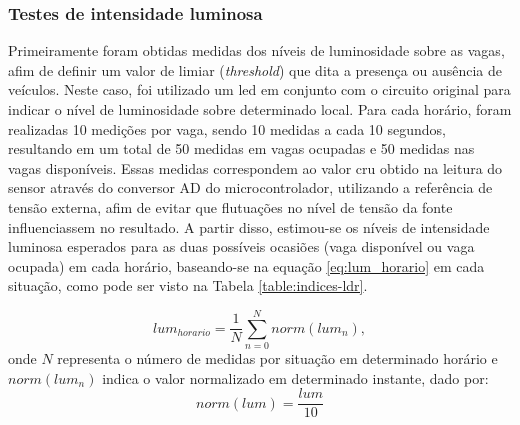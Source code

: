 \documentclass[oneside,openright,12pt]{ufsm_2015} %
\begin{document}
    \subsubsection{Testes de intensidade luminosa}
    Primeiramente foram obtidas medidas dos níveis de luminosidade sobre as vagas, afim de definir um valor de limiar (\textit{threshold}) que dita a presença ou ausência de veículos. Neste caso, foi utilizado um led em conjunto com o circuito original para indicar o nível de luminosidade sobre determinado local. Para cada horário, foram realizadas 10 medições por vaga, sendo 10 medidas a cada 10 segundos, resultando em um total de 50 medidas em vagas ocupadas e 50 medidas nas vagas disponíveis. Essas medidas correspondem ao valor cru obtido na leitura do sensor através do conversor AD do microcontrolador, utilizando a referência de tensão externa, afim de evitar que flutuações no nível de tensão da fonte influenciassem no resultado. A partir disso, estimou-se os níveis de intensidade luminosa esperados para as duas possíveis ocasiões (vaga disponível ou vaga ocupada) em cada horário, baseando-se na equação \ref{eq:lum_horario} em cada situação, como pode ser visto na Tabela \ref{table:indices-ldr}. 

    \begin{equation}
        lum_{horario} = \frac{1}{N} \sum_{n=0}^{N} norm(lum_n),
        \label{eq:lum_horario}
    \end{equation}
    onde $N$ representa o número de medidas por situação em determinado horário e $norm(lum_n)$ indica o valor normalizado em determinado instante, dado por: \begin{equation}
        norm(lum) = \frac{lum}{10}
        \label{eq:norm_lum}
    \end{equation}
    
\end{document}
